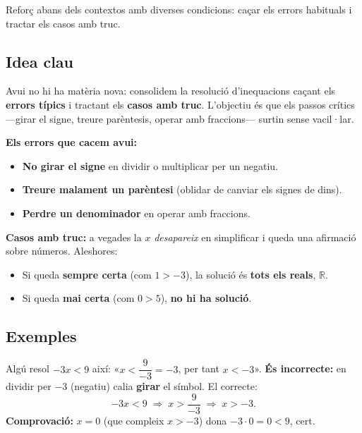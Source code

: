 %
{Reforç abans dels contextos amb diverses condicions: caçar els errors habituals i tractar els casos amb truc.}

\subsection{Idea clau}

Avui no hi ha matèria nova: consolidem la resolució d'inequacions caçant els
\textbf{errors típics} i tractant els \textbf{casos amb truc}. L'objectiu és que els
passos crítics —girar el signe, treure parèntesis, operar amb fraccions— surtin
sense vacil·lar.

\begin{idea}
\textbf{Els errors que cacem avui:}
\begin{itemize}[leftmargin=1.4em, itemsep=2pt]
  \item \textbf{No girar el signe} en dividir o multiplicar per un negatiu.
  \item \textbf{Treure malament un parèntesi} (oblidar de canviar els signes de dins).
  \item \textbf{Perdre un denominador} en operar amb fraccions.
\end{itemize}
\textbf{Casos amb truc:} a vegades la $x$ \emph{desapareix} en simplificar i queda
una afirmació sobre números. Aleshores:
\begin{itemize}[leftmargin=1.4em, itemsep=2pt]
  \item Si queda \textbf{sempre certa} (com $1>-3$), la solució és \textbf{tots els
        reals}, $\mathbb{R}$.
  \item Si queda \textbf{mai certa} (com $0>5$), \textbf{no hi ha solució}.
\end{itemize}
\end{idea}

\subsection{Exemples}

\begin{exemple}
Algú resol $-3x<9$ així: «$x<\dfrac{9}{-3}=-3$, per tant $x<-3$». \textbf{És
incorrecte:} en dividir per $-3$ (negatiu) calia \textbf{girar} el símbol. El correcte:
\[
-3x<9 \;\Rightarrow\; x>\frac{9}{-3} \;\Rightarrow\; x>-3.
\]
\textbf{Comprovació:} $x=0$ (que compleix $x>-3$) dona $-3\cdot 0=0<9$, cert.
\end{exemple}


